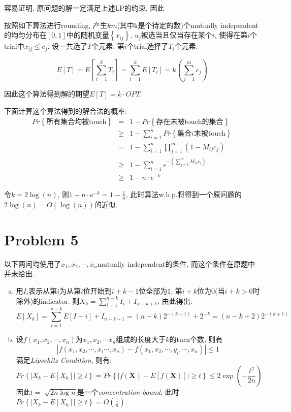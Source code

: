 \documentclass[paper=a4, fontsize=11pt]{scrartcl} %
\numberwithin{equation}{section} %
\numberwithin{figure}{section} %
\numberwithin{table}{section} %
\begin{document}
	容易证明, 原问题的解一定满足上述LP的约束, 因此

	按照如下算法进行rounding, 产生$km$(其中k是个待定的数)个mutually independent的均匀分布在$[0,1]$中的随机变量$\left\{x_{ij}\right\}$. $u_j$被选当且仅当存在某个$i$, 使得在第$i$个trial中$x_{ij}\leq c_j$. 设一共选了$T$个元素, 第$i$个trial选择了$T_i$个元素.

	$$E[T] = E\left[\sum_{i=1}^{k}T_i\right] = \sum_{i=1}^{k}E[T_i] = k\left(\sum_{j=1}^{m}c_j\right)$$
    
    因此这个算法得到解的期望$E[T] = k\cdot OPT$.
    
    下面计算这个算法得到的解合法的概率:
    \begin{eqnarray*}
    Pr\left\{\textrm{所有集合均被touch}\right\} & = &1 - Pr\left\{\textrm{存在未被touch的集合}\right\}\\ 
    & \geq & 1 - \sum_{i=1}^{n} Pr\left\{\textrm{集合$i$未被touch}\right\} \\
    & = & 1 - \sum_{i=1}^{n} \prod_{j=1}^{m}\left(1 - M_{ij}c_j\right) \\
    & \geq & 1 - \sum_{i=1}^{n} e^{-\left(\sum\limits_{j=1}^{m}M_{ij}c_j\right)} \\
    & \geq & 1 - n\cdot e^{-k}
    \end{eqnarray*}
    
    令$k = 2\log(n)$, 则$1 - n\cdot e^{-k} = 1 - \frac{1}{n}$, 此时算法w.h.p.将得到一个原问题的$2\log(n)=O(\log(n))$的近似.
    
\section*{Problem 5	}
以下两问均使用了$x_1, x_2, \cdots, x_n$mutually independent的条件, 而这个条件在原题中并未给出.
\begin{enumerate}[(a)]
	\item
	用$I_i$表示从第$i$为从第$i$位开始到$i+k-1$位全部为$1$, 第$i+k$位为$0$(当$i + k > 0$时除外)的indicator.
	则$X_k = \sum\limits_{i=1}^{n - k} I_i + I_{n-k+1}$, 由此得出:
	$$E[X_k] = \sum_{i = 1}^{n - k}E[I-i] + I_{n-k+1} = (n - k) 2^{-(k+1)} + 2^{-k} = (n - k + 2) 2^{-(k+1)}$$
    \item
    设$f(x_1, x_2, \cdots, x_n)$为$x_1, x_2, \cdots x_n$组成的长度大于$k$的turn个数, 则有
    $$|f(x_1, x_2, \cdots, x_i \cdots, x_n) - f(x_1, x_2, \cdots, y_i, \cdots, x_n)| \leq 1 $$
    满足\textit{Lipschitz Condition}, 则有:
    $$Pr\left\{|X_k - E[X_k]|\geq t\right\}=Pr\left\{\left|f(\mathbf{X}) - E[f(\mathbf{X})]\right| \geq t\right\} \leq 2\exp\left(-\frac{t^2}{2n}\right) $$
    因此$t=\sqrt[]{2n\log n}$是一个\textit{concentration bound}, 此时$Pr\left\{|X_k - E[X_k]|\geq t\right\}=O(\frac{1}{n})$.
	
\end{enumerate}
\end{document}
